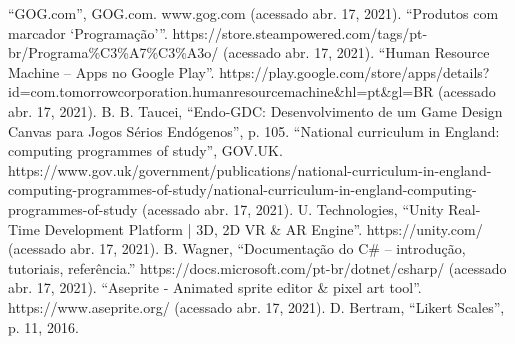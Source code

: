 \documentclass[conference]{IEEEtran}
\begin{document}
\begin{thebibliography}{24}
 ``GOG.com'', GOG.com. www.gog.com (acessado abr. 17, 2021).
 ``Produtos com marcador ‘Programação’''. https://store.steampowered.com/tags/pt-br/Programa\%C3\%A7\%C3\%A3o/ (acessado abr. 17, 2021).
 ``Human Resource Machine – Apps no Google Play''. https://play.google.com/store/apps/details?id=com.tomorrowcorporation.\linebreak humanresourcemachine\&hl=pt\&gl=BR (acessado abr. 17, 2021).
 B. B. Taucei, ``Endo-GDC: Desenvolvimento de um Game Design Canvas para Jogos Sérios Endógenos'', p. 105.
 ``National curriculum in England: computing programmes of study'', GOV.UK. https://www.gov.uk/government/publications/national-curriculum-in-england-computing-programmes-of-study/national-curriculum-in-england-computing-programmes-of-study (acessado abr. 17, 2021).
 U. Technologies, ``Unity Real-Time Development Platform | 3D, 2D VR \& AR Engine''. https://unity.com/ (acessado abr. 17, 2021).
 B. Wagner, ``Documentação do C\# – introdução, tutoriais, referência.'' https://docs.microsoft.com/pt-br/dotnet/csharp/ (acessado abr. 17, 2021).
 ``Aseprite - Animated sprite editor \& pixel art tool''. https://www.aseprite.org/ (acessado abr. 17, 2021).
D. Bertram, ``Likert Scales'', p. 11, 2016.

\end{thebibliography}
\end{document}
